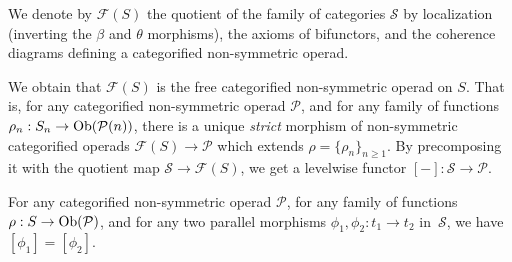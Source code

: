 \begin{definition}
    We denote by $\mathcal{F}(S)$ the quotient of the family of categories $\mathcal{S}$ by localization (inverting the $\beta$ and $\theta$ morphisms), the axioms of bifunctors, and the coherence diagrams defining a categorified non-symmetric operad. 
\end{definition}

We obtain that $\mathcal{F}(S)$ is the free categorified non-symmetric operad on $S$. 
That is, for any categorified non-symmetric operad $\mathcal{P}$, and for any family of functions $\rho_n : S_n \to \mathrm{Ob}(\mathcal{P}(n))$, there is a unique \emph{strict} morphism of non-symmetric categorified operads $\mathcal{F}(S) \to \mathcal{P}$ which extends $\rho=\{\rho_n\}_{n\geq 1}$. 
By precomposing it with the quotient map $\mathcal{S} \to \mathcal{F}(S)$, we get a levelwise functor $[-]:\mathcal{S} \to \mathcal{P}$.

\begin{thm}
\label{thm:coherence-operahedra}
    For any categorified non-symmetric operad $\mathcal{P}$, for any family of functions $\rho : S \to \mathrm{Ob}(\mathcal{P})$, and for any two parallel morphisms $\phi_1,\phi_2: t_1 \to t_2$ in~$\mathcal{S}$, we have $[\phi_1]=[\phi_2]$.
\end{thm}

